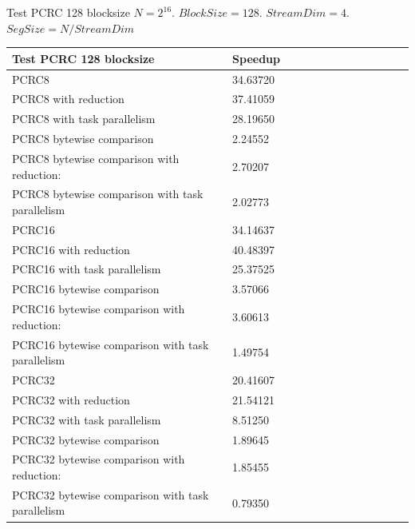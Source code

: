 \documentclass[10pt]{beamer}
\begin{document}
\begin{frame}[fragile]{Test PCRC 128 blocksize}
$N=2^{16}$. $BlockSize=128$. $StreamDim=4$. $SegSize=N/StreamDim$
\begin{footnotesize}
\begin{tabular}{l|l|l|l|l|r|r|r|r|r|r||c|c|}
\toprule
\textbf{Test PCRC 128 blocksize} & \textbf{Speedup} \\
\midrule
PCRC8                                           &	34.63720 \\
PCRC8 with reduction                            &	37.41059 \\
PCRC8 with task parallelism                     &	28.19650 \\
PCRC8 bytewise comparison                       &	2.24552  \\
PCRC8 bytewise comparison with reduction:       &	2.70207  \\
PCRC8 bytewise comparison with task parallelism &	2.02773  \\
PCRC16                                           &	34.14637 \\
PCRC16 with reduction                            &	40.48397 \\
PCRC16 with task parallelism                     &	25.37525 \\
PCRC16 bytewise comparison                       &	3.57066  \\
PCRC16 bytewise comparison with reduction:       &	3.60613  \\
PCRC16 bytewise comparison with task parallelism &	1.49754  \\
PCRC32                                           &	20.41607 \\
PCRC32 with reduction                            &	21.54121 \\
PCRC32 with task parallelism                     &	8.51250  \\
PCRC32 bytewise comparison                       &	1.89645  \\
PCRC32 bytewise comparison with reduction:       &	1.85455  \\
PCRC32 bytewise comparison with task parallelism &	0.79350  \\
\bottomrule
\end{tabular}
\end{footnotesize}
\end{frame}
\end{document}
